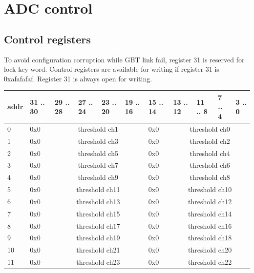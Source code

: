 \documentclass{article}
\begin{document}
\section{ADC control}
\subsection{Control registers}

To avoid configuration corruption while GBT link fail, register 31 is reserved for lock key word. Control registers are available for writing if register 31 is 0xafafafaf. Register 31 is always open for writing.

\begin{table}[H]
\centering
\begin{tabular}{| l | l | l | l | l | l | l | l | l | l | l |}
\hline
addr & 31 .. 30 & 29 .. 28 & 27 .. 24 & 23 .. 20 & 19 .. 16 & 15 .. 14 & 13 .. 12 & 11 .. 8 & 7 .. 4 & 3 .. 0 \\ \hline
0 & 0x0 & \multicolumn{4}{c|}{threshold ch1} & 0x0 & \multicolumn{4}{c|}{threshold ch0} \\ \hline
1 & 0x0 & \multicolumn{4}{c|}{threshold ch3} & 0x0 & \multicolumn{4}{c|}{threshold ch2} \\ \hline
2 & 0x0 & \multicolumn{4}{c|}{threshold ch5} & 0x0 & \multicolumn{4}{c|}{threshold ch4} \\ \hline
3 & 0x0 & \multicolumn{4}{c|}{threshold ch7} & 0x0 & \multicolumn{4}{c|}{threshold ch6} \\ \hline
4 & 0x0 & \multicolumn{4}{c|}{threshold ch9} & 0x0 & \multicolumn{4}{c|}{threshold ch8} \\ \hline
5 & 0x0 & \multicolumn{4}{c|}{threshold ch11} & 0x0 & \multicolumn{4}{c|}{threshold ch10} \\ \hline
6 & 0x0 & \multicolumn{4}{c|}{threshold ch13} & 0x0 & \multicolumn{4}{c|}{threshold ch12} \\ \hline
7 & 0x0 & \multicolumn{4}{c|}{threshold ch15} & 0x0 & \multicolumn{4}{c|}{threshold ch14} \\ \hline
8 & 0x0 & \multicolumn{4}{c|}{threshold ch17} & 0x0 & \multicolumn{4}{c|}{threshold ch16} \\ \hline
9 & 0x0 & \multicolumn{4}{c|}{threshold ch19} & 0x0 & \multicolumn{4}{c|}{threshold ch18} \\ \hline
10 & 0x0 & \multicolumn{4}{c|}{threshold ch21} & 0x0 & \multicolumn{4}{c|}{threshold ch20} \\ \hline
11 & 0x0 & \multicolumn{4}{c|}{threshold ch23} & 0x0 & \multicolumn{4}{c|}{threshold ch22} \\ \hline

\end{tabular}
\end{table}
\end{document}
